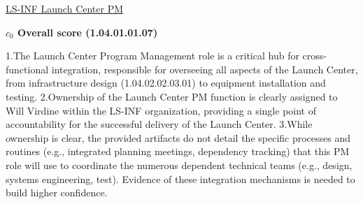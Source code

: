 % 


\begin{frame}{\href{run:../local/source-docs/1.04.01.01.07.pdf}{LS-INF Launch Center PM}}
\centering
{}
\par
\vspace{0.75em}
\textbf{\small{\(c_0\) Overall score {\tiny (1.04.01.01.07)}}}\\\par
\vspace{0.5em}
\begin{minipage}{0.85\textwidth}
\raggedright
\fontsize{7}{9}\selectfont
1.The Launch Center Program Management role is a critical hub for cross-functional integration, responsible for overseeing all aspects of the Launch Center, from infrastructure design (1.04.02.02.03.01) to equipment installation and testing. 2.Ownership of the Launch Center PM function is clearly assigned to Will Virdine within the LS-INF organization, providing a single point of accountability for the successful delivery of the Launch Center. 3.While ownership is clear, the provided artifacts do not detail the specific processes and routines (e.g., integrated planning meetings, dependency tracking) that this PM role will use to coordinate the numerous dependent technical teams (e.g., design, systems engineering, test). Evidence of these integration mechanisms is needed to build higher confidence.\par
\end{minipage}
\end{frame}
%
